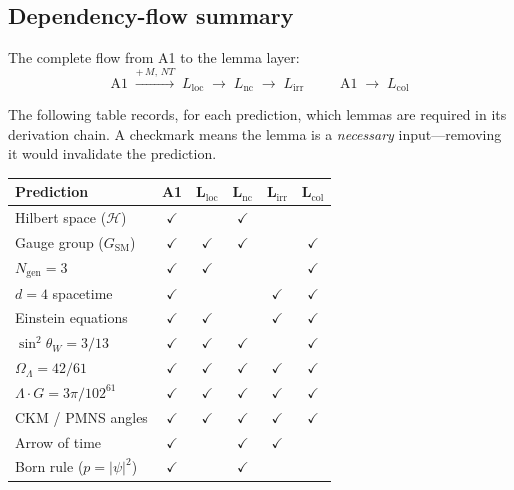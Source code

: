 \documentclass[11pt]{article}
\newcommand{\OmL}{\Omega_\Lambda}
\newcommand{\sw}{\sin^2\!\theta_W}
\newcommand{\Ngen}{N_{\mathrm{gen}}}
\newcommand{\LG}{\Lambda \cdot G}
\newcommand{\Lnc}{L_{\mathrm{nc}}}
\newcommand{\Lloc}{L_{\mathrm{loc}}}
\newcommand{\Lirr}{L_{\mathrm{irr}}}
\newcommand{\Lcol}{L_{\mathrm{col}}}
\begin{document}
\subsection{Dependency-flow summary}

The complete flow from A1 to the lemma layer:
\begin{equation}
\boxed{\;\text{A1} \;\xrightarrow{+\,M,\,NT}\; \Lloc \;\longrightarrow\; \Lnc \;\longrightarrow\; \Lirr\;}
\qquad
\boxed{\;\text{A1} \;\longrightarrow\; \Lcol\;}
\end{equation}

The following table records, for each prediction, which lemmas are required in its derivation chain.  A checkmark means the lemma is a \emph{necessary} input---removing it would invalidate the prediction.

\smallskip
\begin{center}
\small
\renewcommand{\arraystretch}{1.15}
\begin{tabular}{lccccc}
\toprule
\textbf{Prediction} & \textbf{A1} & $\boldsymbol{\Lloc}$ & $\boldsymbol{\Lnc}$ & $\boldsymbol{\Lirr}$ & $\boldsymbol{\Lcol}$ \\
\midrule
Hilbert space ($\mathcal{H}$) & $\checkmark$ & & $\checkmark$ & & \\
Gauge group ($G_{\mathrm{SM}}$) & $\checkmark$ & $\checkmark$ & $\checkmark$ & & $\checkmark$ \\
$\Ngen = 3$ & $\checkmark$ & $\checkmark$ & & & $\checkmark$ \\
$d = 4$ spacetime & $\checkmark$ & & & $\checkmark$ & $\checkmark$ \\
Einstein equations & $\checkmark$ & $\checkmark$ & & $\checkmark$ & $\checkmark$ \\
$\sw = 3/13$ & $\checkmark$ & $\checkmark$ & $\checkmark$ & & $\checkmark$ \\
$\OmL = 42/61$ & $\checkmark$ & $\checkmark$ & $\checkmark$ & $\checkmark$ & $\checkmark$ \\
$\LG = 3\pi/102^{61}$ & $\checkmark$ & $\checkmark$ & $\checkmark$ & $\checkmark$ & $\checkmark$ \\
CKM / PMNS angles & $\checkmark$ & $\checkmark$ & $\checkmark$ & $\checkmark$ & $\checkmark$ \\
Arrow of time & $\checkmark$ & & $\checkmark$ & $\checkmark$ & \\
Born rule ($p = |\psi|^2$) & $\checkmark$ & & $\checkmark$ & & \\
\bottomrule
\end{tabular}
\end{center}
\smallskip
\end{document}
